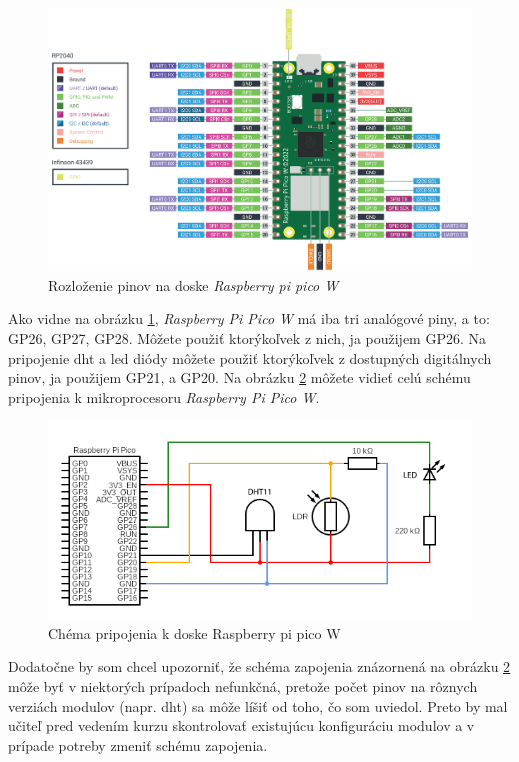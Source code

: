 \begin{figure}[!ht]
    \centering
    \includegraphics[width=\textwidth]{figures/raspberry_pi_pico}
    \caption{Rozloženie pinov na doske \textit{Raspberry pi pico W} \label{pico} \cite{piPico}}
\end{figure}

Ako vidne na obrázku \ref{pico}, \textit{Raspberry Pi Pico W} má iba tri analógové piny, a to: GP26, GP27, GP28. Môžete použiť ktorýkoľvek z nich, ja použijem GP26. Na pripojenie \gls{dht} a \gls{led} diódy môžete použiť ktorýkoľvek z dostupných digitálnych pinov, ja použijem GP21, a GP20. Na obrázku \ref{schema} môžete vidieť celú schému pripojenia k mikroprocesoru \textit{Raspberry Pi Pico W}. 

\begin{figure}[!ht]
    \centering
    \includegraphics[width=\textwidth]{figures/circuit}
    \caption{Chéma pripojenia k doske Raspberry pi pico W \label{schema}}
\end{figure}

Dodatočne by som chcel upozorniť, že schéma zapojenia znázornená na obrázku \ref{schema} môže byť v niektorých prípadoch nefunkčná, pretože počet pinov na rôznych verziách modulov (napr. \gls{dht}) sa môže líšiť od toho, čo som uviedol. Preto by mal učiteľ pred vedením kurzu skontrolovať existujúcu konfiguráciu modulov a v prípade potreby zmeniť schému zapojenia.

